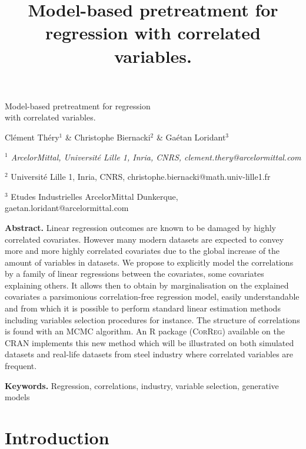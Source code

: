 \documentclass[11pt,a4paper]{article}
\title{Model-based pretreatment for regression with correlated variables.}
\begin{document}
\begin{center}
{\Large
	{\sc Model-based pretreatment for regression \\ with correlated variables.}
}
\bigskip

  Clément Théry$^{1}$ \& Christophe Biernacki$^{2}$ \& Gaétan Loridant$^{3}$
\bigskip

{\it
$^{1}$ ArcelorMittal, Université Lille 1, Inria, CNRS, clement.thery@arcelormittal.com
 
$^{2}$ Université Lille 1, Inria, CNRS, christophe.biernacki@math.univ-lille1.fr

$^{3}$ Etudes Industrielles ArcelorMittal Dunkerque, gaetan.loridant@arcelormittal.com\textbf{}
}
\end{center}
\bigskip

{\bf Abstract.} Linear regression outcomes are known to be damaged by highly correlated covariates. However many modern datasets are expected to convey more and more highly correlated covariates due to the global increase of the amount of variables in datasets. We propose to explicitly model the correlations by a family of linear regressions between the covariates, some covariates explaining others. It allows then to obtain by marginalisation on the explained covariates a parsimonious correlation-free regression model, easily understandable and from which it is possible to perform standard linear estimation methods including variables selection procedures for instance. The structure of correlations is found with an MCMC algorithm. An R package (\textsc{CorReg}) available on the CRAN implements this new method which will be illustrated on both simulated datasets and real-life datasets from steel industry where correlated variables are frequent.
\smallskip

{\bf Keywords.} Regression, correlations, industry, variable selection, generative models

\section{Introduction}
\end{document}
